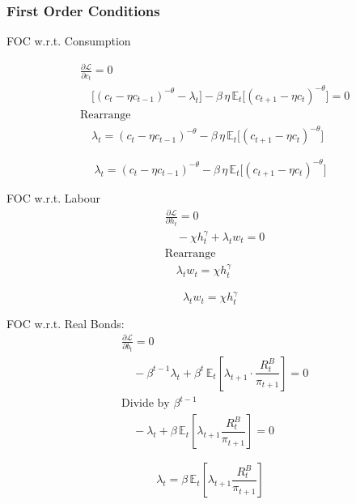 \documentclass[11pt,preprint]{elsarticle}
\numberwithin{equation}{section}
\numberwithin{figure}{section}
\numberwithin{table}{section}
\begin{document}
\subsubsection{\texorpdfstring{First Order Conditions
\label{household_FOC}}{First Order Conditions }}\label{first-order-conditions}

FOC w.r.t. Consumption

\begin{align*}
  & \frac{\partial \mathcal{L}}{\partial c_t} = 0 \\
  & \quad \bigl[(c_t-\eta c_{t-1})^{-\theta} - \lambda_t\bigr] 
    - \beta\,\eta\,\mathbb{E}_t\bigl[(c_{t+1}-\eta c_t)^{-\theta}\bigr] = 0 \\[6pt]
  & \text{Rearrange} \\
  & \quad \lambda_t = (c_t-\eta c_{t-1})^{-\theta} - \beta\,\eta\,\mathbb{E}_t\bigl[(c_{t+1}-\eta c_t)^{-\theta}\bigr]
\end{align*}

\begin{equation}\label{foc_C_app}
\boxed{\lambda_t = (c_t-\eta c_{t-1})^{-\theta} - \beta\,\eta\,\mathbb{E}_t\bigl[(c_{t+1}-\eta c_t)^{-\theta}\bigr]}
\end{equation}

FOC w.r.t. Labour \begin{align*}
  & \frac{\partial \mathcal{L}}{\partial h_t} = 0 \\
  & \quad -\chi h_t^{\gamma} + \lambda_t w_t = 0 \\[6pt]
  & \text{Rearrange} \\
  & \quad \lambda_t w_t = \chi h_t^{\gamma}
\end{align*}

\begin{equation}\label{foc_h_app}
\boxed{\lambda_t w_t = \chi h_t^{\gamma}}
\end{equation}

FOC w.r.t. Real Bonds: \begin{align*}
  & \frac{\partial \mathcal{L}}{\partial b_t} = 0 \\
  & \quad -\beta^{t-1} \lambda_t + \beta^{t} \, \mathbb{E}_t \left[ \lambda_{t+1} \cdot \dfrac{R^B_t}{\pi_{t+1}} \right] = 0 \\[6pt]
  & \text{Divide by } \beta^{t-1} \\
  & \quad -\lambda_t + \beta \, \mathbb{E}_t \left[ \lambda_{t+1} \dfrac{R^B_t}{\pi_{t+1}} \right] = 0
\end{align*}

\begin{equation}\label{foc_B_app}
\boxed{\lambda_t = \beta \, \mathbb{E}_t \left[ \lambda_{t+1} \dfrac{R^B_t}{\pi_{t+1}} \right]}
\end{equation}
\end{document}
